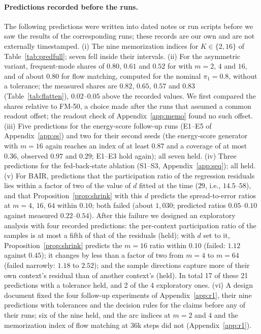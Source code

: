 \paragraph{Predictions recorded before the runs.} The following predictions were written into dated notes or run scripts before we saw the results of the corresponding runs; these records are our own and are not externally timestamped. (i) The nine memorization indices for $K \in \{2, 16\}$ of Table~\ref{tab:predfull}; seven fell inside their intervals. (ii) For the asymmetric variant, frequent-mode shares of $0.80$, $0.61$ and $0.52$ for \imlewm{} with $m = 2$, $4$ and $16$, and of about $0.80$ for flow matching, computed for the nominal $\pi_1 = 0.8$, without a tolerance; the measured shares are $0.82$, $0.65$, $0.57$ and $0.83$ (Table~\ref{tab:flatten}), $0.02$--$0.05$ above the recorded values. We first compared the shares relative to FM-50, a choice made after the runs that assumed a common readout offset; the readout check of Appendix~\ref{app:memo} found no such offset. (iii) Five predictions for the energy-score follow-up runs (E1--E5 of Appendix~\ref{app:es}) and two for their second seeds (the energy-score generator with $m{=}16$ again reaches an index of at least $0.87$ and a coverage of at most $0.36$, observed $0.97$ and $0.29$; E1--E3 hold again); all seven held. (iv) Three predictions for the fed-back-state ablation (S1--S3, Appendix~\ref{app:seq}); all held. (v) For BAIR, predictions that the participation ratio of the regression residuals lies within a factor of two of the value of $d$ fitted at the time ($29$, i.e., $14.5$--$58$), and that Proposition~\ref{prop:shrink} with this $d$ predicts the spread-to-error ratios at $m = 4$, $16$, $64$ within $0.10$; both failed (about $1{,}030$; predicted ratios $0.05$--$0.10$ against measured $0.22$--$0.54$). After this failure we designed an exploratory analysis with four recorded predictions: the per-context participation ratio of the samples is at most a fifth of that of the residuals (held); with $d$ set to it, Proposition~\ref{prop:shrink} predicts the $m{=}16$ ratio within $0.10$ (failed: $1.12$ against $0.45$); it changes by less than a factor of two from $m{=}4$ to $m{=}64$ (failed narrowly: $1.18$ to $2.52$); and the sample directions capture more of their own context's residual than of another context's (held). In total 17 of these 21 predictions with a tolerance held, and 2 of the 4 exploratory ones. (vi) A design document fixed the four follow-up experiments of Appendix~\ref{app:r1}, their nine predictions with tolerances and the decision rules for the claims before any of their runs; six of the nine held, and the arc indices at $m = 2$ and $4$ and the memorization index of flow matching at 36k steps did not (Appendix~\ref{app:r1}).

